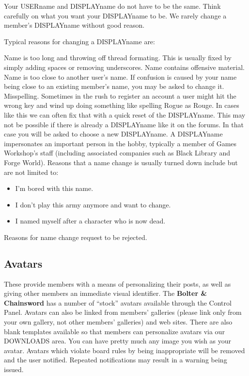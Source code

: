 \documentclass[12pt]{article}
\newcommand{\bnc}{{\textbf{Bolter \& Chainsword}}}%
\begin{document}
Your USERname and DISPLAYname do not have to be the same. Think 
carefully on what you want your DISPLAYname to be. We rarely change a 
member's DISPLAYname without good reason.

Typical reasons for changing a DISPLAYname are:

Name is too long and throwing off thread formating. This is usually 
fixed by simply adding spaces or removing underscores.
Name contains offensive material.
Name is too close to another user's name. If confusion is caused by 
your name being close to an existing member's name, you may be asked to 
change it.
Misspelling. Sometimes in the rush to register an account a user might 
hit the wrong key and wind up doing something like spelling Rogue as 
Rouge. In cases like this we can often fix that with a quick reset of 
the DISPLAYname. This may not be possible if there is already a 
DISPLAYname like it on the forums. In that case you will be asked to 
choose a new DISPLAYname.
A DISPLAYname impersonates an important person in the hobby, typically 
a member of Games Workshop's staff (including associated companies such 
as Black Library and Forge World).
Reasons that a name change is usually turned down include but are not 
limited to:

\begin{table}[H]
\begin{itemize}
\item I'm bored with this name.
\item I don't play this army anymore and want to change.
\item I named myself after a character who is now dead.
\end{itemize}
	\caption{Reasons for name change request to be rejected.}
\end{table}

\subsection{Avatars}

These provide members with a means of personalizing their posts, as 
well as giving other members an immediate visual identifier. The
{\bnc} has a number of ``stock'' avatars available through the 
Control Panel. Avatars can also be linked from members' galleries 
(please link only from your own gallery, not other members' galleries) 
and web sites. There are also blank templates available so that members 
can personalize avatars via our DOWNLOADS area. You can have pretty 
much any image you wish as your avatar. Avatars which violate board 
rules by being inappropriate will be removed and the user notified. 
Repeated notifications may result in a warning being issued.
\end{document}
